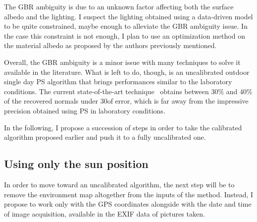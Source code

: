 The GBR ambiguity is due to an unknown factor affecting both the surface albedo and the lighting. I suspect the lighting obtained using a data-driven model to be quite constrained, maybe enough to alleviate the GBR ambiguity issue. In the case this constraint is not enough, I plan to use an optimization method on the material albedo as proposed by the authors previously mentioned.

Overall, the GBR ambiguity is a minor issue with many techniques to solve it available in the literature. What is left to do, though, is an uncalibrated outdoor single day PS algorithm that brings performances similar to the laboratory conditions. The current state-of-the-art technique~\cite{jung-cvpr-15} obtains between 30\% and 40\% of the recovered normals under 30\degree of error, which is far away from the impressive precision obtained using PS in laboratory conditions.

In the following, I propose a succession of steps in order to take the calibrated algorithm proposed earlier and push it to a fully uncalibrated one.






\subsection{Using only the sun position}
\label{subsec:knowingsunposition}

In order to move toward an uncalibrated algorithm, the next step will be to remove the environment map altogether from the inputs of the method. Instead, I propose to work only with the GPS coordinates alongside with the date and time of image acquisition, available in the EXIF data of pictures taken.

